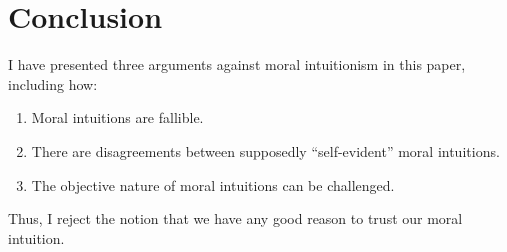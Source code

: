 \section{Conclusion}

I have presented three arguments against moral intuitionism in this paper, including how:

\begin{enumerate}
\item Moral intuitions are fallible.

\item There are disagreements between supposedly ``self-evident'' moral intuitions.

\item The objective nature of moral intuitions can be challenged.
\end{enumerate}

Thus, I reject the notion that we have any good reason to trust our moral intuition.

